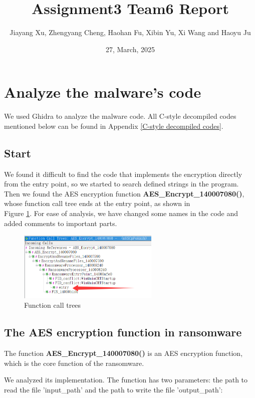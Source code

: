\documentclass[11pt]{article}
\begin{document}
\title{\textbf{Assignment3 Team6 Report}}
\author{Jiayang Xu, Zhengyang Cheng, Haohan Fu, Xibin Yu, Xi Wang and Haoyu Ju}
\date{27, March, 2025}
\maketitle

\section{Analyze the malware's code}
We used Ghidra to analyze the malware code. All C-style decompiled codes mentioned below can be found in Appendix \ref{C-style decompiled codes}. 

\subsection{Start}
We found it difficult to find the code that implements the encryption directly from the entry point, so we started to search defined strings in the program. Then we found the AES encryption function \textbf{AES\_Encrypt\_140007080()}, whose function call tree ends at the entry point, as shown in \\Figure \ref{Call Trees}. For ease of analysis, we have changed some names in the code and added comments to important parts. 

\begin{figure}[htbp]
    \centering
    \includegraphics[width=0.6\textwidth]{img/Call Trees.png}
    \caption{Function call trees}
    \label{Call Trees}
\end{figure}

\subsection{The AES encryption function in ransomware}
The function \textbf{AES\_Encrypt\_140007080()} is an AES encryption function, which is the core function of the ransomware.

We analyzed its implementation. The function has two parameters: the path to read the file 'input\_path' and the path to write the file 'output\_path':
\end{document}
